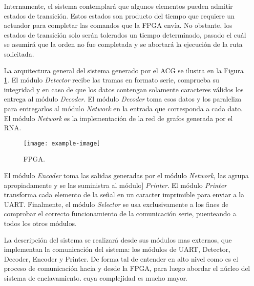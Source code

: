 	Internamente, el sistema contemplará que algunos elementos pueden admitir estados de transición. Estos estados son producto del tiempo que requiere un actuador para completar las comandos que la FPGA envía. No obstante, los estados de transición solo serán tolerados un tiempo determinado, pasado el cuál se asumirá que la orden no fue completada y se abortará la ejecución de la ruta solicitada.
	
	La arquitectura general del sistema generado por el ACG se ilustra en la Figura \ref{fig:GeneralSystem}. El módulo \textit{Detector} recibe las tramas en formato serie, comprueba su integridad y en caso de que los datos contengan solamente caracteres válidos los entrega al módulo \textit{Decoder}. El módulo \textit{Decoder} toma esos datos y los paraleliza para entregarlos al módulo \textit{Network} en la entrada que corresponda a cada dato. El módulo \textit{Network} es la implementación de la red de grafos generada por el RNA. 
	
	\begin{figure}[H]
		\centering
		\texttt{[image: example-image]}
		\centering\caption{FPGA.}
		\label{fig:GeneralSystem}
	\end{figure}
	
	El módulo \textit{Encoder} toma las salidas generadas por el módulo \textit{Network}, las agrupa apropiadamente y se las suministra al módulo] \textit{Printer}. El módulo \textit{Printer} transforma cada elemento de la señal en un caracter imprimible para enviar a la UART. Finalmente, el módulo \textit{Selector} se usa exclusivamente a los fines de comprobar el correcto funcionamiento de la comunicación serie, puenteando a todos los otros módulos.
	
	La descripción del sistema se realizará desde sus módulos mas externos, que implementan la comunicación del sistema: los módulos de UART, Detector, Decoder, Encoder y Printer. De forma tal de entender en alto nivel como es el proceso de comunicación hacia y desde la FPGA, para luego abordar el núcleo del sistema de enclavamiento. cuya complejidad es mucho mayor.		
	

